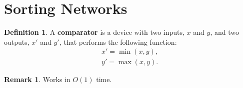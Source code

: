 \documentclass[12pt,openany]{book}
\theoremstyle{definition}
\newtheorem{definition}{Definition}[chapter]
\newtheorem{remark}{Remark}[chapter]
\begin{document}
	
	
	
	
	\newpage
	\section{Sorting Networks}
	\begin{tcolorbox}[colframe=defcolor,title={\color{white}\bf Comparator}]
		\begin{definition}
			A \textbf{comparator} is a device with two inputs, \(x\) and $y$, and two outputs, \(x'\) and $y'$, that performs the following function: \begin{align*}
				x'=\min(x,y),\\
				y'=\max(x,y).
			\end{align*}
			\begin{center}
			\end{center}
		\end{definition}
	\end{tcolorbox}
	\begin{remark}
		Works in \(O(1)\) time.
	\end{remark}
	\vspace{4pt}
\end{document}
